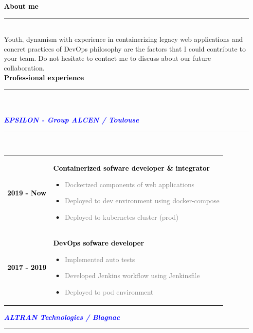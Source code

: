 \documentclass[12pt,A4]{article}
\begin{document}
\begin{minipage}[t]{0.68\textwidth}
%
%
\textcolor{black}{\large \bf About me \vspace{-5pt}\\}
\noindent\textcolor{blue}{\rule{13cm}{.8mm}}\\
%
\hspace*{5mm}
Youth, dynamism with experience in containerizing legacy web applications and concret practices of DevOps philosophy  are the factors that I could contribute to your team.
Do not hesitate to contact me to discuss about our future collaboration.
%
%
\vspace*{1cm}\\
\textcolor{black}{\large \bf Professional experience \vspace{-5pt}\\}
\noindent\textcolor{blue}{\rule{13cm}{.8mm}}\\
%
\vspace*{-5pt}\\
\textcolor{blue}{\bf \textit{EPSILON - Group ALCEN / Toulouse}}\hfill\textcolor{gray!40}{\rule{5cm}{2mm}}\\
\begin{tabular}{P{2.5cm}p{10cm}}
\textcolor{black}{\bf 2019 - Now} & \textcolor{black}{\bf Containerized sofware developer \& integrator}
\begin{itemize}
  \item \small \textcolor{gray}{Dockerized components of web applications}
  \item \small \textcolor{gray}{Deployed to dev environment using docker-compose}
  \item \small \textcolor{gray}{Deployed to kubernetes cluster (prod)}
\end{itemize}\\
\textcolor{black}{\bf 2017 - 2019} & \textcolor{black}{\bf DevOps sofware developer}
\begin{itemize}
  \item \small \textcolor{gray}{Implemented auto tests}
  \item \small \textcolor{gray}{Developed Jenkins workflow using Jenkinsfile}
  \item \small \textcolor{gray}{Deployed to pod environment}
\end{itemize}\\
\end{tabular}
\textcolor{blue}{\bf \textit{ALTRAN Technologies / Blagnac}}\hfill\textcolor{gray!40}{\rule{5cm}{2mm}}\\

\end{minipage}
\end{document}
